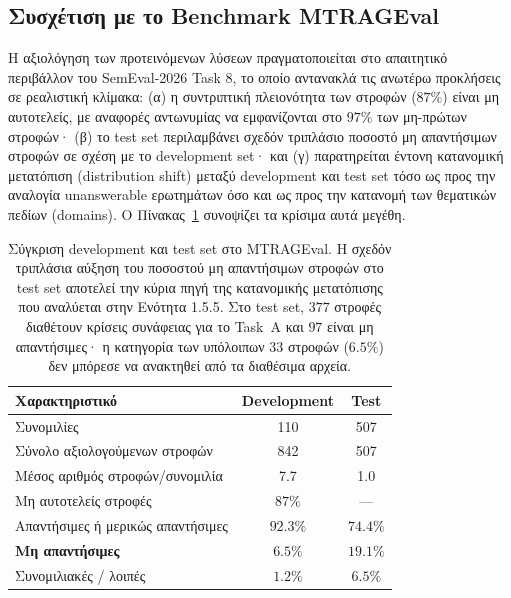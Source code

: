 \subsection{Συσχέτιση με το Benchmark MTRAGEval}

Η αξιολόγηση των προτεινόμενων λύσεων πραγματοποιείται στο απαιτητικό περιβάλλον του SemEval-2026 Task 8, το οποίο αντανακλά τις ανωτέρω προκλήσεις σε ρεαλιστική κλίμακα: (α) η συντριπτική πλειονότητα των στροφών ($87\%$) είναι μη αυτοτελείς, με αναφορές αντωνυμίας να εμφανίζονται στο $97\%$ των μη-πρώτων στροφών· (β) το test set περιλαμβάνει σχεδόν τριπλάσιο ποσοστό μη απαντήσιμων στροφών σε σχέση με το development set· και (γ) παρατηρείται έντονη κατανομική μετατόπιση (distribution shift) μεταξύ development και test set τόσο ως προς την αναλογία unanswerable ερωτημάτων όσο και ως προς την κατανομή των θεματικών πεδίων (domains). Ο Πίνακας~\ref{tab:dev-test-greek} συνοψίζει τα κρίσιμα αυτά μεγέθη.

\begin{table}[h]
\centering
\small
\begin{tabular}{lcc}
\toprule
\textbf{Χαρακτηριστικό} & \textbf{Development} & \textbf{Test} \\
\midrule
Συνομιλίες & 110 & 507 \\
Σύνολο αξιολογούμενων στροφών & 842 & 507 \\
Μέσος αριθμός στροφών/συνομιλία & 7.7 & 1.0 \\
Μη αυτοτελείς στροφές & $87\%$ & — \\
Απαντήσιμες ή μερικώς απαντήσιμες & $92.3\%$ & $74.4\%$ \\
\textbf{Μη απαντήσιμες} & $6.5\%$ & $\mathbf{19.1\%}$ \\
Συνομιλιακές / λοιπές & $1.2\%$ & $6.5\%$ \\
\bottomrule
\end{tabular}
\caption{Σύγκριση development και test set στο MTRAGEval. Η σχεδόν τριπλάσια αύξηση του ποσοστού μη απαντήσιμων στροφών στο test set αποτελεί την κύρια πηγή της κατανομικής μετατόπισης που αναλύεται στην Ενότητα 1.5.5. Στο test set, $377$ στροφές διαθέτουν κρίσεις συνάφειας για το Task~A και $97$ είναι μη απαντήσιμες· η κατηγορία των υπόλοιπων $33$ στροφών ($6.5\%$) δεν μπόρεσε να ανακτηθεί από τα διαθέσιμα αρχεία.}
\label{tab:dev-test-greek}
\end{table}

